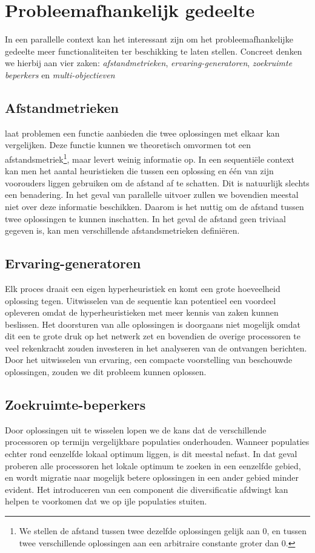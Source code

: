 \section{Probleemafhankelijk gedeelte}

In een parallelle context kan het interessant zijn om het probleemafhankelijke gedeelte meer functionaliteiten ter beschikking te laten stellen. Concreet denken we hierbij aan vier zaken: \emph{afstandmetrieken}, \emph{ervaring-generatoren}, \emph{zoekruimte beperkers} en \emph{multi-objectieven}

\subsection{Afstandmetrieken}
\abhf{} laat problemen een functie aanbieden die twee oplossingen met elkaar kan vergelijken. Deze functie kunnen we theoretisch omvormen tot een afstandsmetriek\footnote{We stellen de afstand tussen twee dezelfde oplossingen gelijk aan 0, en tussen twee verschillende oplossingen aan een arbitraire constante groter dan 0.}, maar levert weinig informatie op. In een sequenti\"ele context kan men het aantal heuristieken die tussen een oplossing en \'e\'en van zijn voorouders liggen gebruiken om de afstand af te schatten. Dit is natuurlijk slechts een benadering. In het geval van parallelle uitvoer zullen we bovendien meestal niet over deze informatie beschikken. Daarom is het nuttig om de afstand tussen twee oplossingen te kunnen inschatten. In het geval de afstand geen triviaal gegeven is, kan men verschillende afstandsmetrieken defini\"eren.
 
\subsection{Ervaring-generatoren}
Elk proces draait een eigen hyperheuristiek en komt een grote hoeveelheid oplossing tegen. Uitwisselen van de sequentie kan potentieel een voordeel opleveren omdat de hyperheuristieken met meer kennis van zaken kunnen beslissen. Het doorsturen van alle oplossingen is doorgaans niet mogelijk omdat dit een te grote druk op het netwerk zet en bovendien de overige processoren te veel rekenkracht zouden investeren in het analyseren van de ontvangen berichten. Door het uitwisselen van ervaring, een compacte voorstelling van beschouwde oplossingen, zouden we dit probleem kunnen oplossen.

\subsection{Zoekruimte-beperkers}
Door oplossingen uit te wisselen lopen we de kans dat de verschillende processoren op termijn vergelijkbare populaties onderhouden. Wanneer populaties echter rond eenzelfde lokaal optimum liggen, is dit meestal nefast\cite{parallelgeneticalgorithms}. In dat geval proberen alle processoren het lokale optimum te zoeken in een eenzelfde gebied, en wordt migratie naar mogelijk betere oplossingen in een ander gebied minder evident. Het introduceren van een component die diversificatie afdwingt kan helpen te voorkomen dat we op ijle populaties stuiten.

